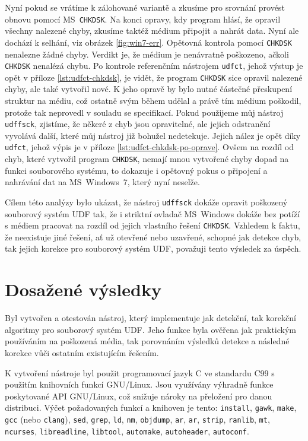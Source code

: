 Nyní pokud se vrátíme k zálohované variantě a zkusíme pro srovnání provést obnovu pomocí MS~\texttt{CHKDSK}. Na konci opravy, kdy program hlásí, že opravil všechny nalezené chyby, zkusíme taktéž médium připojit a nahrát data. Nyní ale dochází k selhání, viz obrázek \ref{fig:win7-err}. Opětovná kontrola pomocí \texttt{CHKDSK} nenalezne žádné chyby. Verdikt je, že médium je nenávratně poškozeno, ačkoli \texttt{CHKDSK} nenalézá chybu. Po kontrole referenčním nástrojem \texttt{udfct}, jehož výstup je opět v příloze \ref{lst:udfct-chkdsk}, je vidět, že program \texttt{CHKDSK} sice opravil nalezené chyby, ale také vytvořil nové. K jeho opravě by bylo nutné částečné přeskupení struktur na médiu, což ostatně svým během udělal a právě tím médium poškodil, protože tak neprovedl v souladu se specifikací. Pokud použijeme můj nástroj \texttt{udffsck}, zjistíme, že někeré z chyb jsou opravitelné, ale jejich odstranění vyvolává další, které můj nástroj již bohužel nedetekuje. Jejich nález je opět díky \texttt{udfct}, jehož výpis je v příloze \ref{lst:udfct-chkdsk-po-oprave}. Ovšem na rozdíl od chyb, které vytvořil program \texttt{CHKDSK}, nemají mnou vytvořené chyby dopad na funkci souborového systému, to dokazuje i opětovný pokus o připojení a nahrávání dat na MS~Windows~7, který nyní neselže.

Cílem této analýzy bylo ukázat, že nástroj \texttt{udffsck} dokáže opravit poškozený souborový systém UDF tak, že i striktní ovladač MS~Windows dokáže bez potíží s médiem pracovat na rozdíl od jejich vlastního řešení \texttt{CHKDSK}. Vzhledem k faktu, že neexistuje jiné řešení, ať už otevřené nebo uzavřené, schopné jak detekce chyb, tak jejich korekce pro souborový systém UDF, považuji tento výsledek za úspěch. 

\section{Dosažené výsledky}
\label{sec:vysledky}
Byl vytvořen a otestován nástroj, který implementuje jak detekční, tak korekční algoritmy pro souborový systém UDF. Jeho funkce byla ověřena jak praktickým používáním na poškozená média, tak porovnáním výsledků detekce a následné korekce vůči ostatním existujícím řešením.

K vytvoření nástroje byl použit programovací jazyk C ve standardu C99 s použitím knihovních funkcí GNU/Linux. Jsou využívány výhradně funkce poskytované API GNU/Linux, což snižuje nároky na přeložení pro danou distribuci. Výčet požadovaných funkcí a knihoven je tento: \texttt{install}, \texttt{gawk}, \texttt{make}, \texttt{gcc} (nebo \texttt{clang}), \texttt{sed}, \texttt{grep}, \texttt{ld}, \texttt{nm}, \texttt{objdump}, \texttt{ar}, \texttt{ar}, \texttt{strip}, \texttt{ranlib}, \texttt{mt}, \texttt{ncurses}, \texttt{libreadline}, \texttt{libtool}, \texttt{automake}, \texttt{autoheader}, \texttt{autoconf}.

